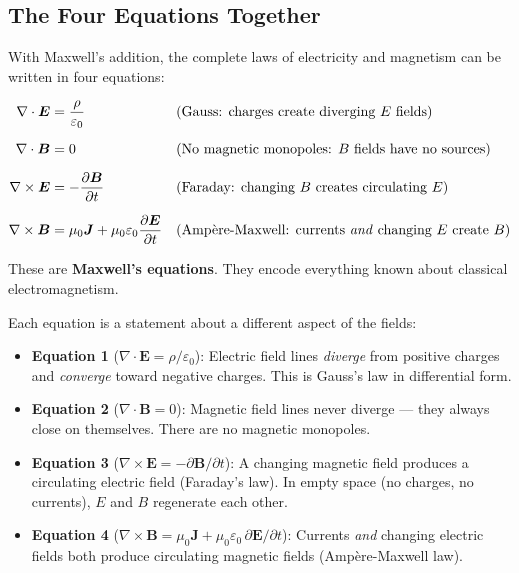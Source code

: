 \documentclass[12pt, a4paper, twoside]{book}
\theoremstyle{disc}
\begin{document}
\subsection{The Four Equations Together}

With Maxwell's addition, the complete laws of electricity and magnetism can be written in four equations:

\begin{align}
  \nabla\cdot\bm{E} &= \frac{\rho}{\varepsilon_0}
  && \text{(Gauss: charges create diverging $E$ fields)} \label{eq:gauss_E}\\[6pt]
  \nabla\cdot\bm{B} &= 0
  && \text{(No magnetic monopoles: $B$ fields have no sources)} \label{eq:gauss_B}\\[6pt]
  \nabla\times\bm{E} &= -\frac{\partial\bm{B}}{\partial t}
  && \text{(Faraday: changing $B$ creates circulating $E$)} \label{eq:faraday}\\[6pt]
  \nabla\times\bm{B} &= \mu_0\bm{J} + \mu_0\varepsilon_0\frac{\partial\bm{E}}{\partial t}
  && \text{(Amp\`ere-Maxwell: currents \emph{and} changing $E$ create $B$)} \label{eq:ampere}
\end{align}

These are \textbf{Maxwell's equations}. They encode everything known about classical electromagnetism.

\begin{tcolorbox}[enhanced, colback=deep!5, colframe=deep,
  title={\bfseries\color{white} Reading Maxwell's Equations},
  attach boxed title to top left={yshift=-2mm,xshift=4mm},
  boxed title style={colback=deep}]
Each equation is a statement about a different aspect of the fields:
\begin{itemize}[leftmargin=1.5em, itemsep=4pt]
  \item \textbf{Equation 1} ($\nabla\cdot\bm{E} = \rho/\varepsilon_0$): Electric field lines \emph{diverge} from positive charges and \emph{converge} toward negative charges. This is Gauss's law in differential form.
  \item \textbf{Equation 2} ($\nabla\cdot\bm{B} = 0$): Magnetic field lines never diverge --- they always close on themselves. There are no magnetic monopoles.
  \item \textbf{Equation 3} ($\nabla\times\bm{E} = -\partial\bm{B}/\partial t$): A changing magnetic field produces a circulating electric field (Faraday's law). In empty space (no charges, no currents), $E$ and $B$ regenerate each other.
  \item \textbf{Equation 4} ($\nabla\times\bm{B} = \mu_0\bm{J} + \mu_0\varepsilon_0\,\partial\bm{E}/\partial t$): Currents \emph{and} changing electric fields both produce circulating magnetic fields (Amp\`ere-Maxwell law).
\end{itemize}
\end{tcolorbox}
\end{document}
